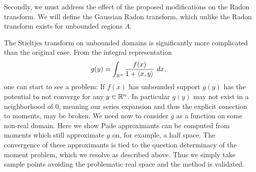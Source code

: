 Secondly, we must address the effect of the proposed modifications on the Radon transform. We will define the Gaussian Radon transform, which unlike the Radon transform exists for unbounded regions $A$. 

The Stieltjes transform on unbounded domains is significantly more complicated than the original case. From the integral representation
\[
    g(y) = \int_{\mathbb{R}^n} \frac{f(x)}{1 + \langle x, y\rangle} ~dx,
\]
one can start to see a problem: If $f(x)$ has unbounded support $g(y)$ has the potential to not converge for any $y \in \mathbb{R}^n$. In particular $g(y)$ may not exist in a neighborhood of $0$, meaning our series expansion and thus the explicit conection to moments, may be broken. We need now to consider $g$ as a function on some non-real domain. Here we show Pade approximants can be computed from moments which still approximate $g$ on, for example, a half space. The convergence of these approximants is tied to the question determinacy of the moment problem, which we resolve as described above. Thus we simply take sample points avoiding the problematic real space and the method is validated.

